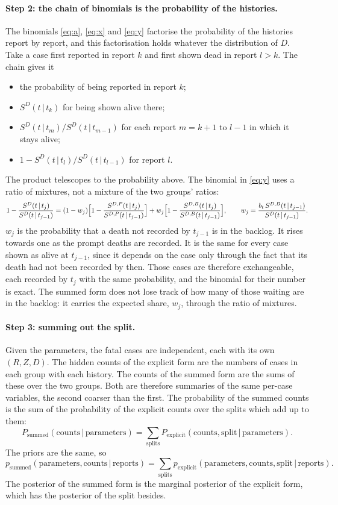 \documentclass[11pt,a4paper]{article}
\newcommand{\given}{\,|\,}
\begin{document}
\paragraph{Step 2: the chain of binomials is the probability of the
histories.} The binomials \eqref{eq:a}, \eqref{eq:x} and \eqref{eq:y}
factorise the probability of the histories report by report, and this
factorisation holds whatever the distribution of $D$. Take a case first
reported in report $k$ and first shown dead in report $l>k$. The chain gives
it
\begin{itemize}
\item the probability of being reported in report $k$;
\item $S^{D}(t\given t_k)$ for being shown alive there;
\item $S^{D}(t\given t_m)/S^{D}(t\given t_{m-1})$ for each report $m=k+1$ to
$l-1$ in which it stays alive;
\item $1-S^{D}(t\given t_l)/S^{D}(t\given t_{l-1})$ for report $l$.
\end{itemize}
The product telescopes to the probability above. The binomial in
\eqref{eq:y} uses a ratio of mixtures, not a mixture of the two groups'
ratios:
\[
1-\frac{S^{D}(t\given t_j)}{S^{D}(t\given t_{j-1})}
=(1-w_j)\Bigl[1-\frac{S^{D,P}(t\given t_j)}{S^{D,P}(t\given t_{j-1})}\Bigr]
+w_j\Bigl[1-\frac{S^{D,B}(t\given t_j)}{S^{D,B}(t\given t_{j-1})}\Bigr],
\qquad
w_j=\frac{b_t\,S^{D,B}(t\given t_{j-1})}{S^{D}(t\given t_{j-1})}.
\]
$w_j$ is the probability that a death not recorded by $t_{j-1}$ is in the
backlog. It rises towards one as the prompt deaths are recorded. It is the
same for every case shown as alive at $t_{j-1}$, since it depends on the case
only through the fact that its death had not been recorded by then. Those
cases are therefore exchangeable, each recorded by $t_j$ with the same
probability, and the binomial for their number is exact. The summed form
does not lose track of how many of those waiting are in the backlog: it
carries the expected share, $w_j$, through the ratio of mixtures.

\paragraph{Step 3: summing out the split.} Given the parameters, the fatal
cases are independent, each with its own $(R,Z,D)$. The hidden counts of the
explicit form are the numbers of cases in each group with each history. The
counts of the summed form are the sums of these over the two groups. Both
are therefore summaries of the same per-case variables, the second coarser
than the first. The probability of the summed counts is the sum of the
probability of the explicit counts over the splits which add up to them:
\[
P_{\mathrm{summed}}(\text{counts}\given\text{parameters})
=\sum_{\text{splits}}P_{\mathrm{explicit}}(\text{counts},\text{split}\given\text{parameters}).
\]
The priors are the same, so
\[
p_{\mathrm{summed}}(\text{parameters},\text{counts}\given\text{reports})
=\sum_{\text{splits}}p_{\mathrm{explicit}}(\text{parameters},\text{counts},\text{split}\given\text{reports}).
\]
The posterior of the summed form is the marginal posterior of the explicit
form, which has the posterior of the split besides.
\end{document}
